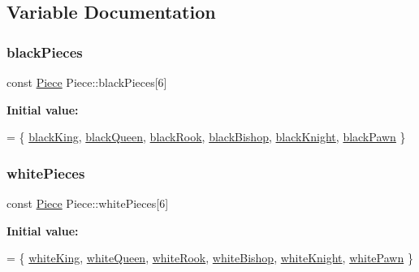 \subsection{Variable Documentation}
\mbox{\label{namespacePiece_a531c90c92acec2708048ce3b9caddf2a}} 
\subsubsection{\texorpdfstring{black\+Pieces}{blackPieces}}
{\footnotesize\ttfamily const \hyperlink{namespacePiece_a588233307aa6bdb32c1d62c9f20895cc}{Piece} Piece\+::black\+Pieces\mbox{[}6\mbox{]}\hspace{0.3cm}{\ttfamily [static]}}

{\bfseries Initial value\+:}
\begin{DoxyCode}
=
\{ \hyperlink{namespacePiece_a588233307aa6bdb32c1d62c9f20895cca8fd6b39fd07d6f6d313c6c37e8986596}{blackKing}, \hyperlink{namespacePiece_a588233307aa6bdb32c1d62c9f20895cca147d5bd99f9c8b1f736a7ffd9af83f09}{blackQueen}, \hyperlink{namespacePiece_a588233307aa6bdb32c1d62c9f20895cca1da0d86bf116e4c986675fcace583f13}{blackRook}, \hyperlink{namespacePiece_a588233307aa6bdb32c1d62c9f20895cca5e396d34f6422c8b44144ec6c3a95bd2}{blackBishop}, 
      \hyperlink{namespacePiece_a588233307aa6bdb32c1d62c9f20895cca79be088eed40853bcfcd8004e147a5d3}{blackKnight}, \hyperlink{namespacePiece_a588233307aa6bdb32c1d62c9f20895cca81afc92740074cc0028b5194899ec606}{blackPawn} \}
\end{DoxyCode}
\mbox{\label{namespacePiece_a8c9ba77d6f9a9bb67a5a5d8e95a9f945}} 
\subsubsection{\texorpdfstring{white\+Pieces}{whitePieces}}
{\footnotesize\ttfamily const \hyperlink{namespacePiece_a588233307aa6bdb32c1d62c9f20895cc}{Piece} Piece\+::white\+Pieces\mbox{[}6\mbox{]}\hspace{0.3cm}{\ttfamily [static]}}

{\bfseries Initial value\+:}
\begin{DoxyCode}
=
\{ \hyperlink{namespacePiece_a588233307aa6bdb32c1d62c9f20895cca2413b8a3f7cbb59125d05af815d19214}{whiteKing}, \hyperlink{namespacePiece_a588233307aa6bdb32c1d62c9f20895cca44ed6948de9734e4bd12bb96c0427b88}{whiteQueen}, \hyperlink{namespacePiece_a588233307aa6bdb32c1d62c9f20895cca75b73b8c2f4b1d4ce1cb480615e6690e}{whiteRook}, \hyperlink{namespacePiece_a588233307aa6bdb32c1d62c9f20895cca2b4899b0787cd23d26e8bf347514bdad}{whiteBishop}, 
      \hyperlink{namespacePiece_a588233307aa6bdb32c1d62c9f20895cca90a2215b75839cca5eb08277fe4c3e1f}{whiteKnight}, \hyperlink{namespacePiece_a588233307aa6bdb32c1d62c9f20895cca79f8da67447a78c648d3f246338d58e1}{whitePawn} \}
\end{DoxyCode}
